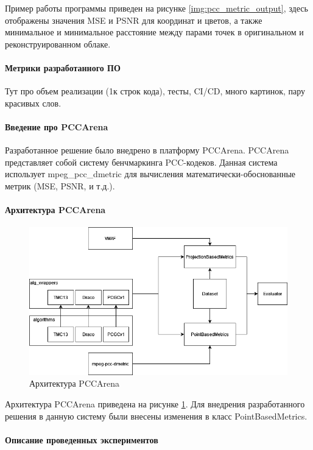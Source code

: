 \documentclass[a4paper,12pt]{extreport}
\begin{document}
Пример работы программы приведен на рисунке \ref{img:pcc_metric_output}, здесь
отображены значения MSE и PSNR для координат и цветов, а также минимальное и
минимальное расстояние между парами точек в оригинальном и реконструированном
облаке.

\paragraph{Метрики разработанного ПО}

Тут про объем реализации (1к строк кода), тесты, CI/CD, много картинок, пару
красивых слов.

\paragraph{Введение про PCCArena}

Разработанное решение было внедрено в платформу PCCArena. PCCArena представляет
собой систему бенчмаркинга PCC-кодеков. Данная система использует
mpeg\_pcc\_dmetric для вычисления математически-обоснованные метрик (MSE, PSNR,
и т.д.).

\paragraph{Архитектура PCCArena}

\begin{figure}[H]
    \centering
    \includegraphics[width=0.7\linewidth]{assets/pcc_arena_architecture.png}
    \caption{Архитектура PCCArena}
    \label{img:pcc_arena_architecture}
\end{figure}

Архитектура PCCArena приведена на рисунке \ref{img:pcc_arena_architecture}. Для
внедрения разработанного решения в данную систему были внесены изменения в класс
PointBasedMetrics.

\paragraph{Описание проведенных экспериментов}
\end{document}
